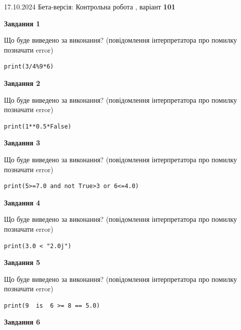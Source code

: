 \documentclass[12pt, ukrainian]{article}
\begin{document}
{\Large{17.10.2024 Бета-версія: Контрольна робота , варіант  \No \textbf { 101 }\par}}
{
\begin {large}
{\begin {center}\textbf{Завдання 1}\end {center}}

Що буде виведено за виконання? (повідомлення інтерпретатора про помилку позначати error)\par
\begin{verbatim}
print(3/4%9*6)
\end{verbatim}

{\begin {center}\textbf{Завдання 2}\end {center}}

Що буде виведено за виконання? (повідомлення інтерпретатора про помилку позначати error)\par
\begin{verbatim}
print(1**0.5*False)
\end{verbatim}

{\begin {center}\textbf{Завдання 3}\end {center}}

Що буде виведено за виконання? (повідомлення інтерпретатора про помилку позначати error)\par
\begin{verbatim}
print(5>=7.0 and not True>3 or 6<=4.0)
\end{verbatim}

{\begin {center}\textbf{Завдання 4}\end {center}}

Що буде виведено за виконання? (повідомлення інтерпретатора про помилку позначати error)\par
\begin{verbatim}
print(3.0 < "2.0j")
\end{verbatim}

{\begin {center}\textbf{Завдання 5}\end {center}}

Що буде виведено за виконання? (повідомлення інтерпретатора про помилку позначати error)\par
\begin{verbatim}
print(9  is  6 >= 8 == 5.0)
\end{verbatim}

{\begin {center}\textbf{Завдання 6}\end {center}}


\end{large}}
\end{document}
